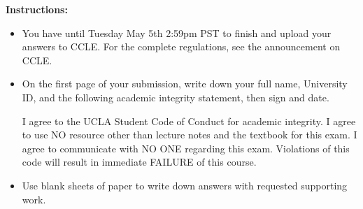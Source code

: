 \documentclass[12pt,a4paper]{article}
\begin{document}
\noindent\textbf{Instructions:}
\begin{itemize}
	\item You have until Tuesday May 5th 2:59pm PST to finish and upload your answers to CCLE. For the complete regulations, see the announcement on CCLE.
    \item On the first page of your submission, write down your full name, University ID, and the following academic integrity statement, then sign and date. 
\begin{center}
    \parbox{0.8\textwidth}{
\textsf{I agree to the UCLA Student Code of Conduct for academic integrity. I agree to use NO resource other than lecture notes and the textbook for this exam. I agree to communicate with NO ONE regarding this exam. Violations of this code will result in immediate FAILURE of this course. }}
\end{center}
	\item Use blank sheets of paper to write down answers with requested supporting work.
\end{itemize}

\newpage
\end{document}
